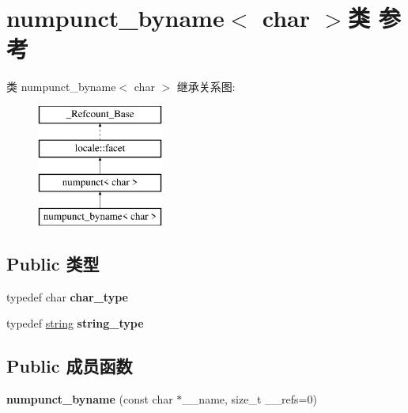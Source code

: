 \hypertarget{classnumpunct__byname_3_01char_01_4}{}\section{numpunct\+\_\+byname$<$ char $>$类 参考}
\label{classnumpunct__byname_3_01char_01_4}
类 numpunct\+\_\+byname$<$ char $>$ 继承关系图\+:\begin{figure}[H]
\begin{center}
\leavevmode
\includegraphics[height=4.000000cm]{classnumpunct__byname_3_01char_01_4}
\end{center}
\end{figure}
\subsection*{Public 类型}
\begin{DoxyCompactItemize}
\item 
\mbox{\label{classnumpunct__byname_3_01char_01_4_a056aac9f808fccdfbe67f4960ab59d28}} 
typedef char {\bfseries char\+\_\+type}
\item 
\mbox{\label{classnumpunct__byname_3_01char_01_4_a6bd2d474fa55b534f88dc2ef920d55d8}} 
typedef \hyperlink{structstring}{string} {\bfseries string\+\_\+type}
\end{DoxyCompactItemize}
\subsection*{Public 成员函数}
\begin{DoxyCompactItemize}
\item 
\mbox{\label{classnumpunct__byname_3_01char_01_4_a265f3f195527678e6061cc17810fd5bc}} 
{\bfseries numpunct\+\_\+byname} (const char $\ast$\+\_\+\+\_\+name, size\+\_\+t \+\_\+\+\_\+refs=0)
\end{DoxyCompactItemize}
